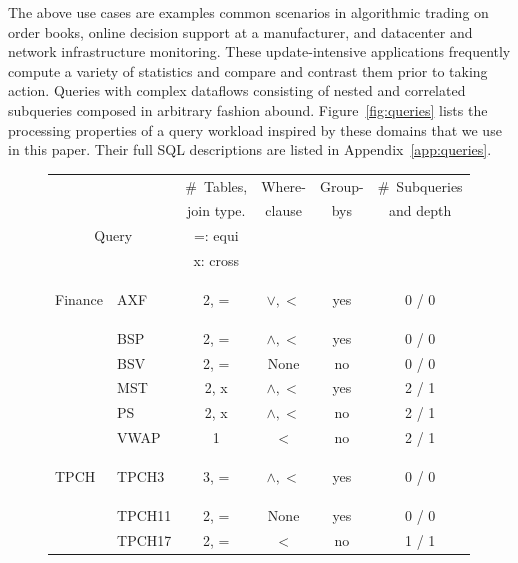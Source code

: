 \vspace{1mm}
The above use cases are examples common scenarios in algorithmic trading on
order books, online decision support at a manufacturer, and datacenter and
network infrastructure monitoring. 
These update-intensive applications frequently compute a variety of statistics
and compare and contrast them prior to taking action. Queries with complex
dataflows consisting of nested and correlated subqueries composed in arbitrary
fashion abound.
Figure~\ref{fig:queries} lists the processing properties of a query workload
inspired by these domains that we use in this paper. Their full SQL
descriptions are listed in Appendix~\ref{app:queries}.

\begin{figure}[t]
\scriptsize{
\begin{center}
\begin{tabular}{ p{0.15cm} | l | c | c | c  | c }
\multicolumn{2}{c|}{}      & \#~Tables,  & Where- & Group- & \#~Subqueries\\
\multicolumn{2}{c|}{}      & join type.  & clause & bys    & and depth\\
\multicolumn{2}{c|}{Query} & =: equi     &        &        & \\
\multicolumn{2}{c|}{}      & x: cross    &        &        & \\
\hline
\begin{rotate}{90}\hspace{-1.1cm}Finance\end{rotate}
& AXF        & 2, =      & $\vee, <$     & yes & 0 / 0 \\
& BSP        & 2, =      & $\wedge, <$   & yes & 0 / 0 \\
& BSV        & 2, =      & None          & no  & 0 / 0 \\
& MST        & 2, x      & $\wedge, <$   & yes & 2 / 1 \\
& PS         & 2, x      & $\wedge, <$   & no  & 2 / 1 \\
& VWAP       & 1         & $<$           & no  & 2 / 1 \\
\hline
\begin{rotate}{90}\hspace{-1.1cm}TPCH\end{rotate}
& TPCH3      & 3, =      & $\wedge, <$   & yes & 0 / 0 \\
& TPCH11     & 2, =      & None          & yes & 0 / 0 \\
& TPCH17     & 2, =      & $<$           & no  & 1 / 1 \\

\end{tabular}
\end{center}}
\end{figure}
